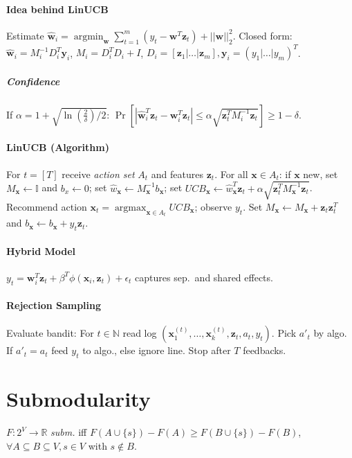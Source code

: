 \documentclass[11pt]{scrartcl}
\DeclareMathOperator{\argmin}{argmin}
\DeclareMathOperator{\argmax}{argmax}
\newcommand{\eps}{\epsilon}
\newcommand{\N}{\mathbb{N}}
\newcommand{\R}{\mathbb{R}}
\begin{document}
\begin{multicols}{3}
\paragraph{Idea behind LinUCB}
Estimate $\hat{\bm w}_{i} = \argmin_{\bm w}\sum_{t=1}^{m}(y_t-\bm w^T\bm z_t) + ||\bm w||_2^2$.
Closed form: $\hat{\bm w}_{i} = M_{i}^{-1}D_{i}^T\bm y_{i}$,
$M_{i} = D_{i}^TD_{i} + I$,
$D_{i} = [\bm z_1|\dots|\bm z_m], \bm y_{i} = (y_1|\dots|y_m)^T$.
\subparagraph{Confidence} If $\alpha = 1 + \sqrt{\ln(\frac{2}{\delta})/2}$: \newline
$\Pr\left [|\hat{\bm w}_{i}^T\bm z_t - \bm w_{i}^T\bm z_t| \leq \alpha\sqrt{\bm z_t^T M_{i}^{-1}\bm z_t}\right ] \geq 1-\delta$.

\paragraph{LinUCB (Algorithm)}
For $t = [T]$ receive \emph{action set} $A_t$ and features $\bm z_t$. For all $\bm x \in A_t$: if $\bm x$ new, set $M_{\bm x} \leftarrow \mathbb{I}$ and $b_x \leftarrow 0$;
set $\hat w_{\bm x} \leftarrow M_{\bm x}^{-1}b_{\bm x}$;
set $UCB_{\bm x} \leftarrow \hat w_{\bm x}^T \bm z_t + \alpha\sqrt{\bm z_t^T M_{\bm x}^{-1} \bm z_t}$.
Recommend action $\bm x_t = \argmax_{\bm x \in A_t} UCB_{\bm x}$; observe $y_t$.
Set $M_{\bm x} \leftarrow M_{\bm x} + \bm z_t \bm z_t^T$ and $b_{\bm x} \leftarrow b_{\bm x} + y_t \bm z_t$.

\paragraph{Hybrid Model}
$y_t = \bm w_i^T \bm z_t + \beta^T \phi(\bm x_i,\bm z_t) + \eps_t$
captures sep.\ and shared effects.

\paragraph{Rejection Sampling}
Evaluate bandit: For $t \in \N$ read log $(\bm x_1^{(t)},\dots,\bm x_k^{(t)},\bm z_t,a_t,y_t)$.
Pick $a'_t$ by algo. If $a'_t = a_t$ feed $y_t$ to algo., else ignore line. Stop after $T$ feedbacks.

\section{Submodularity}
$F:2^V \rightarrow \R$ \emph{subm.} iff $F(A \cup \{s \})-F(A) \geq F(B\cup \{s\})-F(B)$,\\
$\forall A \subseteq B \subseteq V, s \in V$ with $s \notin B$.


\end{multicols}
\end{document}
